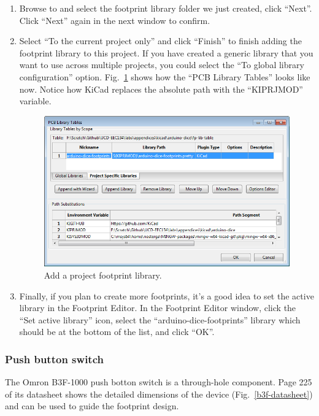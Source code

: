 \documentclass[12pt,letterpaper]{scrartcl}
\begin{document}
\begin{enumerate}
\begin{enumerate}
			\item Browse to and select the footprint library folder we just created, click ``Next''. Click ``Next'' again in the next window to confirm. 
			
			\item Select ``To the current project only'' and click ``Finish'' to finish adding the footprint library to this project. If you have created a generic library that you want to use across multiple projects, you could select the ``To global library configuration'' option. Fig.~\ref{fig:add-project-footprint-lib} shows how the ``PCB Library Tables'' looks like now. Notice how KiCad replaces the absolute path with the ``KIPRJMOD'' variable. 

					\begin{figure}[hp]
						\centering
						\includegraphics[width=5in]{add-project-footprint-lib}
						\caption{Add a project footprint library.}
						\label{fig:add-project-footprint-lib}
					\end{figure}
					
			\item Finally, if you plan to create more footprints, it's a good idea to set the active library in the Footprint Editor. In the Footprint Editor window, click the ``Set active library'' icon, select the ``arduino-dice-footprints'' library which should be at the bottom of the list, and click ``OK''.  
		\end{enumerate}
	
\end{enumerate}

\subsubsection{Push button switch}
\label{sec:sw_footprint}
The Omron B3F-1000 push botton switch is a through-hole component. Page 225 of its datasheet shows the detailed dimensions of the device (Fig.~\ref{b3f-datasheet}) and can be used to guide the footprint design.  
\end{document}
